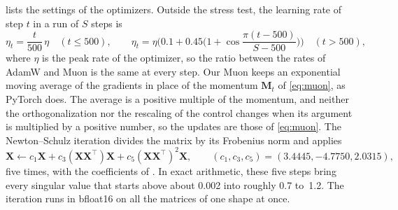 \documentclass[11pt, a4paper]{article}
\begin{document}
 lists the settings of the optimizers. Outside the stress test, the learning rate of step $t$ in a run of $S$ steps is
\begin{equation*}
  \eta_t = \frac{t}{500}\, \eta \quad (t \leq 500), \qquad \eta_t = \eta \biggl( 0.1 + 0.45 \biggl( 1 + \cos \frac{\pi (t - 500)}{S - 500} \biggr) \biggr) \quad (t > 500),
\end{equation*}
where $\eta$ is the peak rate of the optimizer, so the ratio between the rates of AdamW and Muon is the same at every step. Our Muon keeps an exponential moving average of the gradients in place of the momentum $\mathbf{M}_t$ of \cref{eq:muon}, as PyTorch does. The average is a positive multiple of the momentum, and neither the orthogonalization nor the rescaling of the control changes when its argument is multiplied by a positive number, so the updates are those of \cref{eq:muon}. The Newton--Schulz iteration divides the matrix by its Frobenius norm and applies
\begin{equation*}
  \mathbf{X} \leftarrow c_1 \mathbf{X} + c_3 (\mathbf{X} \mathbf{X}^{\top}) \mathbf{X} + c_5 (\mathbf{X} \mathbf{X}^{\top})^2 \mathbf{X}, \qquad (c_1, c_3, c_5) = (3.4445, -4.7750, 2.0315),
\end{equation*}
five times, with the coefficients of \citet{jordan2024muon}. In exact arithmetic, these five steps bring every singular value that starts above about 0.002 into roughly 0.7 to~1.2. The iteration runs in bfloat16 on all the matrices of one shape at once.
\end{document}
